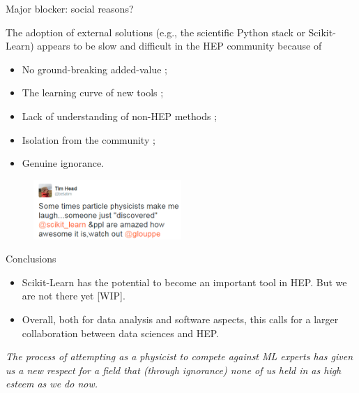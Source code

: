 \documentclass{beamer}
\begin{document}
\begin{frame}{Major blocker: social reasons?}


The adoption of external solutions (e.g., the scientific Python stack or Scikit-Learn) appears to be slow and difficult in the HEP community because of

    \begin{itemize}
        \item No ground-breaking added-value ;
        \item The learning curve of new tools ;
        \item Lack of understanding of non-HEP methods ;
        \item Isolation from the community ;
        \item Genuine ignorance.
    \end{itemize}

\begin{figure}
\includegraphics[width=0.5\textwidth]{./figures/tim.png}
\end{figure}


\end{frame}


\begin{frame}{Conclusions}

\begin{itemize}

\vspace{0.5cm}

\item Scikit-Learn has the potential to become an important tool in HEP. But we are not there yet [WIP].

\vspace{0.5cm}

\item Overall, both for data analysis and software aspects, this calls
  for a {\color{blue} larger collaboration between data sciences and HEP}.
\end{itemize}

\vspace{0.25cm}

\begin{center}
\it The process of attempting as a physicist to compete against ML experts
has given us a new respect for a field that (through ignorance) none of us held in as high esteem as we do now.
\end{center}

\end{frame}
\end{document}
